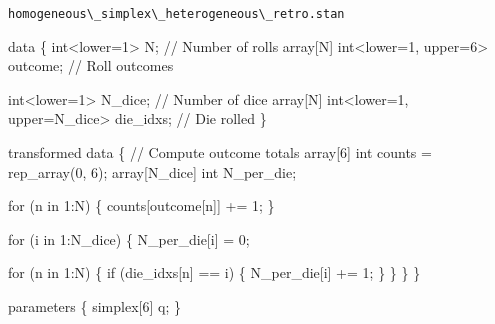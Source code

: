\documentclass[
  letterpaper,
  DIV=11,
  numbers=noendperiod]{scrartcl}
\newenvironment{Shaded}{\begin{snugshade}}{\end{snugshade}}
\newcommand{\CommentTok}[1]{\textcolor[rgb]{0.37,0.37,0.37}{#1}}
\newcommand{\ControlFlowTok}[1]{\textcolor[rgb]{0.00,0.23,0.31}{#1}}
\newcommand{\DataTypeTok}[1]{\textcolor[rgb]{0.68,0.00,0.00}{#1}}
\newcommand{\DecValTok}[1]{\textcolor[rgb]{0.68,0.00,0.00}{#1}}
\newcommand{\KeywordTok}[1]{\textcolor[rgb]{0.00,0.23,0.31}{#1}}
\newcommand{\NormalTok}[1]{\textcolor[rgb]{0.00,0.23,0.31}{#1}}
\begin{document}
\begin{codelisting}

\caption{\texttt{homogeneous\textbackslash\_simplex\textbackslash\_heterogeneous\textbackslash\_retro.stan}}

\begin{Shaded}
\begin{Highlighting}[]
\KeywordTok{data}\NormalTok{ \{}
  \DataTypeTok{int}\NormalTok{\textless{}}\KeywordTok{lower}\NormalTok{=}\DecValTok{1}\NormalTok{\textgreater{} N;                         }\CommentTok{// Number of rolls}
  \DataTypeTok{array}\NormalTok{[N] }\DataTypeTok{int}\NormalTok{\textless{}}\KeywordTok{lower}\NormalTok{=}\DecValTok{1}\NormalTok{, }\KeywordTok{upper}\NormalTok{=}\DecValTok{6}\NormalTok{\textgreater{} outcome; }\CommentTok{// Roll outcomes}

  \DataTypeTok{int}\NormalTok{\textless{}}\KeywordTok{lower}\NormalTok{=}\DecValTok{1}\NormalTok{\textgreater{} N\_dice;                          }\CommentTok{// Number of dice}
  \DataTypeTok{array}\NormalTok{[N] }\DataTypeTok{int}\NormalTok{\textless{}}\KeywordTok{lower}\NormalTok{=}\DecValTok{1}\NormalTok{, }\KeywordTok{upper}\NormalTok{=N\_dice\textgreater{} die\_idxs; }\CommentTok{// Die rolled}
\NormalTok{\}}

\KeywordTok{transformed data}\NormalTok{ \{}
  \CommentTok{// Compute outcome totals}
  \DataTypeTok{array}\NormalTok{[}\DecValTok{6}\NormalTok{] }\DataTypeTok{int}\NormalTok{ counts = rep\_array(}\DecValTok{0}\NormalTok{, }\DecValTok{6}\NormalTok{);}
  \DataTypeTok{array}\NormalTok{[N\_dice] }\DataTypeTok{int}\NormalTok{ N\_per\_die;}

  \ControlFlowTok{for}\NormalTok{ (n }\ControlFlowTok{in} \DecValTok{1}\NormalTok{:N) \{}
\NormalTok{    counts[outcome[n]] += }\DecValTok{1}\NormalTok{;}
\NormalTok{  \}}

  \ControlFlowTok{for}\NormalTok{ (i }\ControlFlowTok{in} \DecValTok{1}\NormalTok{:N\_dice) \{}
\NormalTok{    N\_per\_die[i] = }\DecValTok{0}\NormalTok{;}

    \ControlFlowTok{for}\NormalTok{ (n }\ControlFlowTok{in} \DecValTok{1}\NormalTok{:N) \{}
      \ControlFlowTok{if}\NormalTok{ (die\_idxs[n] == i) \{}
\NormalTok{        N\_per\_die[i] += }\DecValTok{1}\NormalTok{;}
\NormalTok{      \}}
\NormalTok{    \}}
\NormalTok{  \}}
\NormalTok{\}}

\KeywordTok{parameters}\NormalTok{ \{}
  \DataTypeTok{simplex}\NormalTok{[}\DecValTok{6}\NormalTok{] q;}
\NormalTok{\}}


\end{Highlighting}
\end{Shaded}
\end{codelisting}
\end{document}
